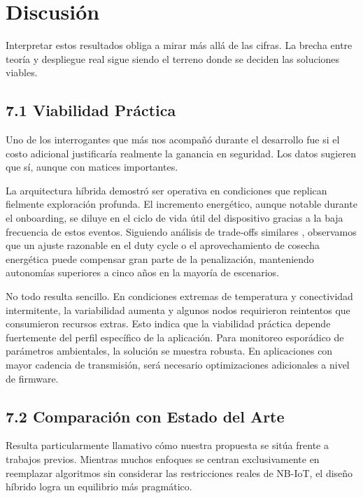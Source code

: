 \section{Discusión}

Interpretar estos resultados obliga a mirar más allá de las cifras. La brecha entre teoría y despliegue real sigue siendo el terreno donde se deciden las soluciones viables.

\subsection{7.1 Viabilidad Práctica}

Uno de los interrogantes que más nos acompañó durante el desarrollo fue si el costo adicional justificaría realmente la ganancia en seguridad. Los datos sugieren que sí, aunque con matices importantes. 

La arquitectura híbrida demostró ser operativa en condiciones que replican fielmente exploración profunda. El incremento energético, aunque notable durante el onboarding, se diluye en el ciclo de vida útil del dispositivo gracias a la baja frecuencia de estos eventos. Siguiendo análisis de trade-offs similares \cite{Do2026_PQCAware}, observamos que un ajuste razonable en el duty cycle o el aprovechamiento de cosecha energética puede compensar gran parte de la penalización, manteniendo autonomías superiores a cinco años en la mayoría de escenarios.

No todo resulta sencillo. En condiciones extremas de temperatura y conectividad intermitente, la variabilidad aumenta y algunos nodos requirieron reintentos que consumieron recursos extras. Esto indica que la viabilidad práctica depende fuertemente del perfil específico de la aplicación. Para monitoreo esporádico de parámetros ambientales, la solución se muestra robusta. En aplicaciones con mayor cadencia de transmisión, será necesario optimizaciones adicionales a nivel de firmware.

\subsection{7.2 Comparación con Estado del Arte}

Resulta particularmente llamativo cómo nuestra propuesta se sitúa frente a trabajos previos. Mientras muchos enfoques se centran exclusivamente en reemplazar algoritmos sin considerar las restricciones reales de NB-IoT, el diseño híbrido logra un equilibrio más pragmático.

